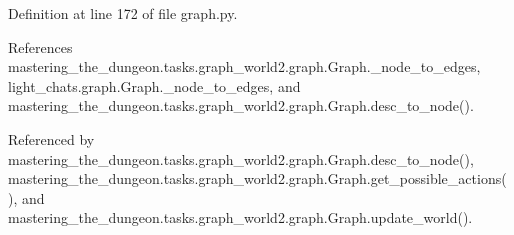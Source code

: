 Definition at line 172 of file graph.\+py.



References mastering\+\_\+the\+\_\+dungeon.\+tasks.\+graph\+\_\+world2.\+graph.\+Graph.\+\_\+node\+\_\+to\+\_\+edges, light\+\_\+chats.\+graph.\+Graph.\+\_\+node\+\_\+to\+\_\+edges, and mastering\+\_\+the\+\_\+dungeon.\+tasks.\+graph\+\_\+world2.\+graph.\+Graph.\+desc\+\_\+to\+\_\+node().



Referenced by mastering\+\_\+the\+\_\+dungeon.\+tasks.\+graph\+\_\+world2.\+graph.\+Graph.\+desc\+\_\+to\+\_\+node(), mastering\+\_\+the\+\_\+dungeon.\+tasks.\+graph\+\_\+world2.\+graph.\+Graph.\+get\+\_\+possible\+\_\+actions(), and mastering\+\_\+the\+\_\+dungeon.\+tasks.\+graph\+\_\+world2.\+graph.\+Graph.\+update\+\_\+world().

